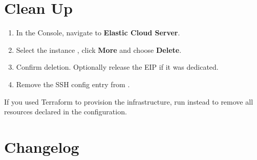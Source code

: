 \documentclass[english]{guide}
\begin{document}
\section{Clean Up}

\begin{objetivos}
\end{objetivos}

\passoapasso
\begin{enumerate}
  \item In the Console, navigate to \textbf{Elastic Cloud Server}.
  \item Select the instance , click \textbf{More} and
        choose \textbf{Delete}.
  \item Confirm deletion. Optionally release the EIP if it was dedicated.
  \item Remove the SSH config entry from .
\end{enumerate}

\begin{aviso}
If you used Terraform to provision the infrastructure, run
 instead to remove all resources declared in the
configuration.
\end{aviso}


\section{Changelog}
\end{document}
